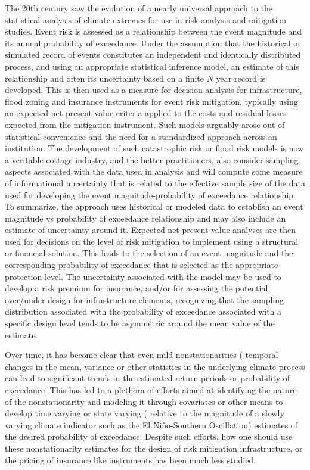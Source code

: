 \documentclass[11pt]{article}
\begin{document}
The 20th century saw the evolution of a nearly universal approach to the statistical analysis of climate extremes for use in risk analysis and mitigation studies.
Event risk is assessed as a relationship between the event magnitude and its annual probability of exceedance.  
Under the assumption that the historical or simulated record of events constitutes an independent and identically distributed process, and using an appropriate statistical inference model, an estimate of this relationship and often its uncertainty based on a finite \(N\) year record is developed. 
This is then used as a measure for decision analysis for infrastructure, flood zoning and insurance instruments for event risk mitigation, typically using an expected net present value criteria applied to the costs and residual losses expected from the mitigation instrument. 
Such models arguably arose out of statistical convenience and the need for a standardized approach across an institution. 
The development of such catastrophic risk or flood risk models is now a veritable cottage industry, and the better practitioners, also consider sampling aspects associated with the data used in analysis and will compute some measure of informational uncertainty that is related to the effective sample size of the data used for developing the event magnitude-probability of exceedance relationship. 
To summarize, the approach uses historical or modeled data to establish an event magnitude vs probability of exceedance relationship and may also include an estimate of uncertainty around it. 
Expected net present value analyses are then used for decisions on the level of risk mitigation to implement using a structural or financial solution. 
This leads to the selection of an event magnitude and the corresponding probability of exceedance that is selected as the appropriate protection level. The uncertainty associated with the model may be used to develop a risk premium for insurance, and/or for assessing the potential over/under design for infrastructure elements, recognizing that the sampling distribution associated with the probability of exceedance associated with a specific design level tends to be asymmetric around the mean value of the estimate. 

Over time, it has become clear that even mild nonstationarities (\ie{} temporal changes in the mean, variance or other statistics in the underlying climate process can lead to significant trends in the estimated return periods or probability of exceedance.
This has led to a plethora of efforts aimed at identifying the nature of the nonstationarity and modeling it through covariates or other means to develop time varying or state varying (\eg{} relative to the magnitude of a slowly varying climate indicator such as the El Ni\~{n}o-Southern Oscillation) estimates of the desired probability of exceedance.
Despite such efforts, how one should use these nonstationarity estimates for the design of risk mitigation infrastructure, or the pricing of insurance like instruments has been much less studied.
\end{document}
